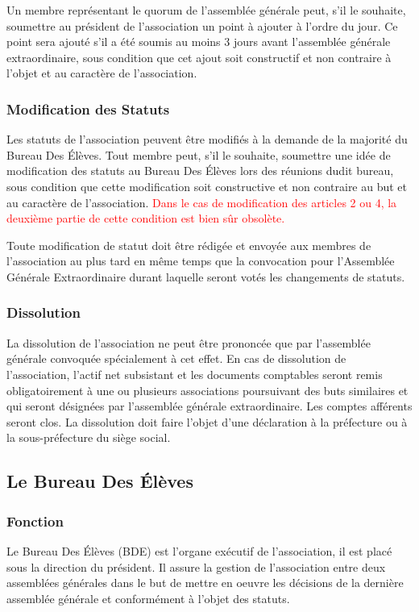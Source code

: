\documentclass{article} %
\begin{document}
				Un membre représentant le quorum de l’assemblée générale peut, s’il le souhaite, soumettre au président de l’association un point à ajouter
				à l’ordre du jour. Ce point sera ajouté s’il a été soumis au moins 3 jours avant l’assemblée générale extraordinaire, sous condition que cet
				ajout soit constructif et non contraire à l'objet et au caractère de l’association.

			\subsubsection{Modification des Statuts}
				Les statuts de l’association peuvent être modifiés à la demande de la majorité du Bureau Des Élèves. Tout membre peut, s’il le souhaite,
				soumettre une idée de modification des statuts au Bureau Des Élèves lors des réunions dudit bureau, sous condition que cette modification
				soit constructive et non contraire au but et au caractère de l’association. \textcolor{red}{Dans le cas de modification des articles 2 ou 4,
				la deuxième partie de cette condition est bien sûr obsolète.}

				Toute modification de statut doit être rédigée et envoyée aux membres de l’association au plus tard en même temps que la convocation pour
				l’Assemblée Générale Extraordinaire durant laquelle seront votés les changements de statuts.

			\subsubsection{Dissolution}
				La dissolution de l’association ne peut être prononcée que par l’assemblée générale convoquée spécialement à cet effet.
				En cas de dissolution de l’association, l’actif net subsistant et les documents comptables seront remis obligatoirement à une ou plusieurs
				associations poursuivant des buts similaires et qui seront désignées par l’assemblée générale extraordinaire. Les comptes afférents seront clos.
				La dissolution doit faire l’objet d’une déclaration à la préfecture ou à la sous-préfecture du siège social.

		\subsection{Le Bureau Des Élèves}
			\subsubsection{Fonction}
				Le Bureau Des Élèves (BDE) est l'organe exécutif de l'association, il est placé sous la direction du président.
				Il assure la gestion de l'association entre deux assemblées générales dans le but de mettre en oeuvre les décisions
				de la dernière assemblée générale et conformément à l'objet des statuts.
\end{document}
